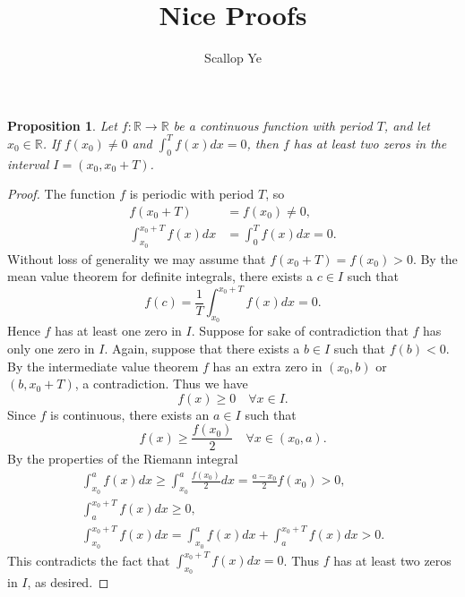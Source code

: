 \documentclass{amsart}
\title{Nice Proofs}
\author{Scallop Ye}
\newtheorem{proposition}{Proposition}
\begin{document}
\maketitle

\begin{proposition}
    Let $f:\mathbb{R}\to\mathbb{R}$ be a continuous function with period $T$, and let $x_0\in\mathbb{R}$.
    If $f(x_0)\neq0$ and $\int_{0}^{T}f(x)dx=0$, then $f$ has
    at least two zeros in the interval $I=(x_0,x_0+T)$.
\end{proposition}

\begin{proof}
    The function $f$ is periodic with period $T$, so
    \begin{align*}
        f(x_0+T)                 & =f(x_0)\neq0,          \\
        \int_{x_0}^{x_0+T}f(x)dx & =\int_{0}^{T}f(x)dx=0.
    \end{align*}
    Without loss of generality we may assume that $f(x_0+T)=f(x_0)>0$.
    By the mean value theorem for definite integrals, there exists a $c\in I$ such that
    \[f(c)=\frac{1}{T}\int_{x_0}^{x_0+T}f(x)dx=0.\]
    Hence $f$ has at least one zero in $I$. Suppose for sake of contradiction that
    $f$ has only one zero in $I$. Again, suppose that
    there exists a $b\in I$ such that $f(b)<0$. By the intermediate value theorem
    $f$ has an extra zero in $(x_0,b)$ or $(b,x_0+T)$, a contradiction. Thus we have
    \[f(x)\ge0\quad\forall x\in I.\]
    Since $f$ is continuous, there exists an $a\in I$ such that
    \[f(x)\ge\frac{f(x_0)}{2}\quad\forall x\in(x_0,a).\]
    By the properties of the Riemann integral
    \begin{align*}
        \int_{x_0}^{a}f(x)dx\ge\int_{x_0}^{a}\frac{f(x_0)}{2}dx=\frac{a-x_0}{2}f(x_0)>0,\\
        \int_{a}^{x_0+T}f(x)dx\ge0,\\
        \int_{x_0}^{x_0+T}f(x)dx=\int_{x_0}^{a}f(x)dx+\int_{a}^{x_0+T}f(x)dx>0.
    \end{align*}
    This contradicts the fact that $\int_{x_0}^{x_0+T}f(x)dx=0$.
    Thus $f$ has at least two zeros in $I$, as desired.
\end{proof}
\end{document}
